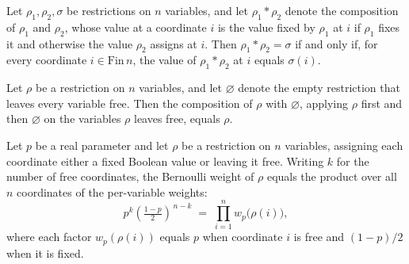 \begin{lemma}
\label{LMN.composeRestr_eq_iff}
\leanok
{}
Let $\rho_1,\rho_2,\sigma$ be restrictions on $n$ variables, and let $\rho_1 \ast
\rho_2$ denote the composition of $\rho_1$ and $\rho_2$, whose value at a coordinate $i$
is the value fixed by $\rho_1$ at $i$ if $\rho_1$ fixes it and otherwise the value
$\rho_2$ assigns at $i$. Then $\rho_1 \ast \rho_2 = \sigma$ if and only if, for every
coordinate $i \in \mathrm{Fin}\,n$, the value of $\rho_1 \ast \rho_2$ at $i$ equals
$\sigma(i)$.
\end{lemma}

\begin{lemma}
\label{LMN.composeRestr_id_right}
\leanok
{}
Let $\rho$ be a restriction on $n$ variables, and let $\varnothing$ denote the empty
restriction that leaves every variable free. Then the composition of $\rho$ with
$\varnothing$, applying $\rho$ first and then $\varnothing$ on the variables $\rho$
leaves free, equals $\rho$.
\end{lemma}

\begin{lemma}
\label{LMN.bernoulliRestrWeight_eq_prod}
\leanok
{}
Let $p$ be a real parameter and let $\rho$ be a restriction on $n$ variables, assigning
each coordinate either a fixed Boolean value or leaving it free. Writing $k$ for the
number of free coordinates, the Bernoulli weight of $\rho$ equals the product over all
$n$ coordinates of the per-variable weights:
\[
  p^{k}\left(\tfrac{1-p}{2}\right)^{\,n-k}
  \;=\;
  \prod_{i=1}^{n} w_p\bigl(\rho(i)\bigr),
\]
where each factor $w_p(\rho(i))$ equals $p$ when coordinate $i$ is free and $(1-p)/2$
when it is fixed.
\end{lemma}

